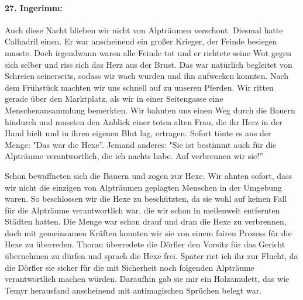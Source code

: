 \paragraph{27. Ingerimm:}
Auch diese Nacht blieben wir nicht von Alpträumen verschont. Diesmal hatte Calhadril einen. Er war anscheinend ein großer Krieger, der Feinde besiegen musste. Doch irgendwann waren alle Feinde tot und er richtete seine Wut gegen sich selber und riss sich das Herz aus der Brust. Das war natürlich begleitet von Schreien seinerseits, sodass wir wach wurden und ihn aufwecken konnten. Nach dem Frühstück machten wir uns schnell auf zu unseren Pferden. Wir ritten gerade über den Marktplatz, als wir in einer Seitengasse eine Menschenansammlung bemerkten. Wir bahnten uns einen Weg durch die Bauern hindurch und mussten den Anblick einer toten alten Frau, die ihr Herz in der Hand hielt und in ihren eigenen Blut lag, ertragen. Sofort tönte es aus der Menge: "Das war die Hexe''. Jemand anderes: "Sie ist bestimmt auch für die Alpträume verantwortlich, die ich nachts habe. Auf verbrennen wir sie!'' \par

Schon bewaffneten sich die Bauern und zogen zur Hexe. Wir ahnten sofort, dass wir nicht die einzigen von Alpträumen geplagten Menschen in der Umgebung waren. So beschlossen wir die Hexe zu beschützten, da sie wohl auf keinen Fall für die Alpträume verantwortlich war, die wir schon in meilenweit entfernten Städten hatten. Die Menge war schon drauf und dran die Hexe zu verbrennen, doch mit gemeinsamen Kräften konnten wir sie von einem fairen Prozess für die Hexe zu überreden. Thoran überredete die Dörfler den Vorsitz für das Gericht übernehmen zu dürfen und sprach die Hexe frei. Später riet ich ihr zur Flucht, da die Dörfler sie sicher für die mit Sicherheit noch folgenden Alpträume verantwortlich machen würden. Daraufhin gab sie mir ein Holzamulett, das wie Temyr herausfand anscheinend mit antimagischen Sprüchen belegt war.\par

